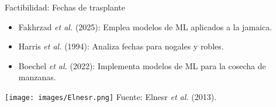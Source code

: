 \documentclass[aspectratio=169]{beamer}
\begin{document}
\begin{frame}{Factibilidad: Fechas de trasplante}
	\begin{minipage}{0.5\textwidth}
		\begin{block}{}
			\begin{itemize}
				\item Fakhrzad \textit{et al.} (2025): Emplea modelos de ML aplicados a la jamaica.
				\item Harris \textit{et al.} (1994): Analiza fechas para nogales y robles. 
				\item Boechel \textit{et al.} (2022): Implementa modelos de ML para la cosecha de manzanas.
			\end{itemize}
		\end{block}
	\end{minipage}%
	\begin{minipage}{0.5\textwidth}
		\hspace{0cm}
		\centering
		\texttt{[image: images/Elnesr.png]}
		{\scriptsize Fuente: Elnesr \textit{et al.} (2013).}
	\end{minipage}%
\end{frame}
\end{document}
